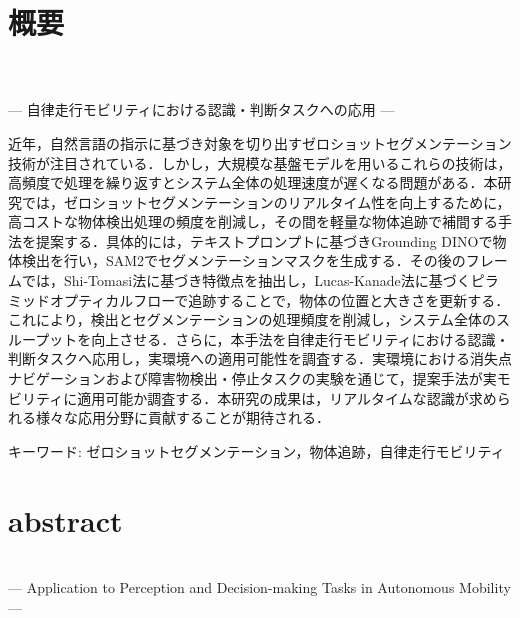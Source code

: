 \chapter*{概要}
\thispagestyle{empty}
%
\begin{center}
  \\
  \\
  {--- 自律走行モビリティにおける認識・判断タスクへの応用 ---}
\end{center}
\vspace{1.0zh}

近年，自然言語の指示に基づき対象を切り出すゼロショットセグメンテーション技術が注目されている．しかし，大規模な基盤モデルを用いるこれらの技術は，高頻度で処理を繰り返すとシステム全体の処理速度が遅くなる問題がある．本研究では，ゼロショットセグメンテーションのリアルタイム性を向上するために，高コストな物体検出処理の頻度を削減し，その間を軽量な物体追跡で補間する手法を提案する．具体的には，テキストプロンプトに基づきGrounding DINOで物体検出を行い，SAM2でセグメンテーションマスクを生成する．その後のフレームでは，Shi-Tomasi法に基づき特徴点を抽出し，Lucas-Kanade法に基づくピラミッドオプティカルフローで追跡することで，物体の位置と大きさを更新する．これにより，検出とセグメンテーションの処理頻度を削減し，システム全体のスループットを向上させる．さらに，本手法を自律走行モビリティにおける認識・判断タスクへ応用し，実環境への適用可能性を調査する．実環境における消失点ナビゲーションおよび障害物検出・停止タスクの実験を通じて，提案手法が実モビリティに適用可能か調査する．本研究の成果は，リアルタイムな認識が求められる様々な応用分野に貢献することが期待される．
%

キーワード: ゼロショットセグメンテーション，物体追跡，自律走行モビリティ

%
\newpage
\chapter*{abstract}
\thispagestyle{empty}
%
\begin{center}
  \\
  {--- Application to Perception and Decision-making Tasks in Autonomous Mobility ---}
\end{center}
\vspace{1.0zh}
%

